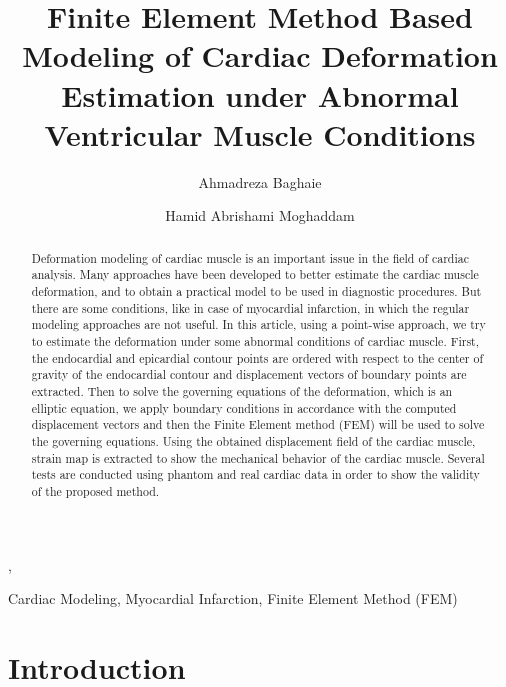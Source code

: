 \documentclass{jicspack}
\begin{document}
\begin{premaker}


\title{Finite Element Method Based Modeling of Cardiac Deformation Estimation under Abnormal Ventricular Muscle Conditions}


\author[author1]{Ahmadreza Baghaie},
\author[author2]{Hamid Abrishami Moghaddam}

\address[author1]{Department of Electrical Engineering, University of Wisconsin-Milwaukee, WI, USA 53211}
\address[author2]{Department of Biomedical Engineering, K.N.Toosi University of Technology, Tehran, Iran}





\begin{abstract}
Deformation modeling of cardiac muscle is an important issue in the field of cardiac analysis. Many approaches have been developed to better estimate the cardiac muscle deformation, and to obtain a practical model to be used in diagnostic procedures. But there are some conditions, like in case of myocardial infarction, in which the regular modeling approaches are not useful. In this article, using a point-wise approach, we try to estimate the deformation under some abnormal conditions of cardiac muscle. First, the endocardial and epicardial contour points are ordered with respect to the center of gravity of the endocardial contour and displacement vectors of boundary points are extracted. Then to solve the governing equations of the deformation, which is an elliptic equation, we apply boundary conditions in accordance with the computed displacement vectors and then the Finite Element method (FEM) will be used to solve the governing equations. Using the obtained displacement field of the cardiac muscle, strain map is extracted to show the mechanical behavior of the cardiac muscle. Several tests are conducted using phantom and real cardiac data in order to show the validity of the proposed method. 
\end{abstract}
\begin{keyword}
Cardiac Modeling, Myocardial Infarction, Finite Element Method (FEM)
\end{keyword}
\end{premaker}



\section{Introduction}\label{Intro}
\end{document}
